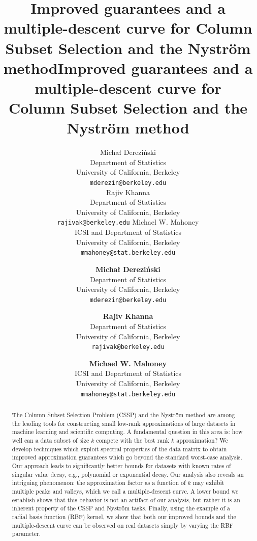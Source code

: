 \documentclass{article}
\title{Improved guarantees and a multiple-descent curve for %
  Column Subset Selection %
  and the Nystr\"om method}
\author{%
          Micha{\l } Derezi\'{n}ski \\
  Department of Statistics\\
  University of California, Berkeley\\
  \texttt{mderezin@berkeley.edu}\\
  \And
{Rajiv Khanna} \\
  Department of Statistics\\
  University of California, Berkeley\\
  \texttt{rajivak@berkeley.edu}
  \And
   Michael W. Mahoney\\
  ICSI and Department of Statistics\\
  University of California, Berkeley\\
  \texttt{mmahoney@stat.berkeley.edu}
  }
\begin{document}
\ifisarxiv
\title{Improved guarantees and a multiple-descent curve for\\ %
  Column Subset Selection %
  and the Nystr\"om method}
  \author{%
          \textbf{Micha{\l } Derezi\'{n}ski} \\
  Department of Statistics\\
  University of California, Berkeley\\
  \texttt{mderezin@berkeley.edu}\\
  \and
\textbf{Rajiv Khanna} \\
  Department of Statistics\\
  University of California, Berkeley\\
  \texttt{rajivak@berkeley.edu}
  \and
   \textbf{Michael W. Mahoney}\\
  ICSI and Department of Statistics\\
  University of California, Berkeley\\
  \texttt{mmahoney@stat.berkeley.edu}
  }

\else\fi

\ifisarxiv
  \date{}
\fi
  \maketitle


\begin{abstract}
The Column Subset Selection Problem (CSSP) and the Nystr\"om method
are among the leading tools for constructing small low-rank
approximations of large datasets in machine learning and scientific
computing.  
A fundamental question in this area is: how well can a data subset of
size $k$ compete with the best rank $k$ approximation?
We develop techniques which exploit spectral properties of the data
matrix to obtain improved approximation guarantees which go beyond the
standard worst-case analysis. 
Our approach leads to significantly better bounds for datasets with
known rates of singular value decay, e.g., polynomial or exponential
decay.  
Our analysis also reveals an intriguing phenomenon: the approximation
factor as a function of $k$ may exhibit multiple peaks and valleys,
which we call a multiple-descent curve.  
A lower bound we establish shows that this behavior is not an artifact
of our analysis, but rather it is an inherent property of the CSSP and
Nystr\"om tasks.
Finally, using the example of a radial basis function (RBF)
kernel, we show that both our improved bounds and the multiple-descent
curve can be observed on real datasets simply by varying the 
RBF parameter.  
\end{abstract}
\end{document}
